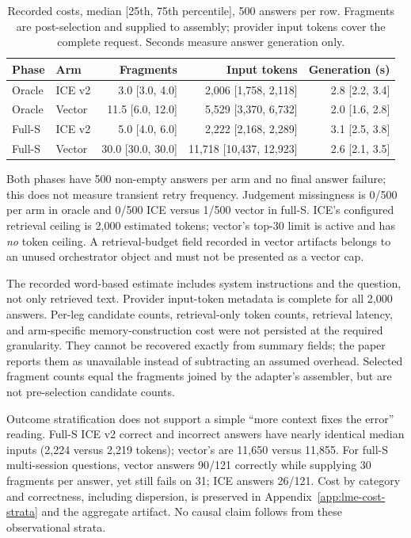 \documentclass[11pt,a4paper]{article}
\begin{document}
\begin{table}[htbp]
\centering\small
\caption{Recorded costs, median [25th, 75th percentile], 500 answers per row. Fragments are post-selection and supplied to assembly; provider input tokens cover the complete request. Seconds measure answer generation only.}
\label{tab:lme-cost}
\begin{tabular}{@{}llrrr@{}}\toprule
Phase & Arm & Fragments & Input tokens & Generation (s)\\\midrule
Oracle & ICE v2 & 3.0 [3.0, 4.0] & 2,006 [1,758, 2,118] & 2.8 [2.2, 3.4]\\
Oracle & Vector & 11.5 [6.0, 12.0] & 5,529 [3,370, 6,732] & 2.0 [1.6, 2.8]\\
Full-S & ICE v2 & 5.0 [4.0, 6.0] & 2,222 [2,168, 2,289] & 3.1 [2.5, 3.8]\\
Full-S & Vector & 30.0 [30.0, 30.0] & 11,718 [10,437, 12,923] & 2.6 [2.1, 3.5]\\
\bottomrule\end{tabular}
\end{table}
Both phases have 500 non-empty answers per arm and no final answer failure; this does not measure transient retry frequency. Judgement missingness is 0/500 per arm in oracle and 0/500 ICE versus 1/500 vector in full-S. ICE's configured retrieval ceiling is 2,000 estimated tokens; vector's top-30 limit is active and has \emph{no} token ceiling. A retrieval-budget field recorded in vector artifacts belongs to an unused orchestrator object and must not be presented as a vector cap.

The recorded word-based estimate includes system instructions and the question, not only retrieved text. Provider input-token metadata is complete for all 2,000 answers. Per-leg candidate counts, retrieval-only token counts, retrieval latency, and arm-specific memory-construction cost were not persisted at the required granularity. They cannot be recovered exactly from summary fields; the paper reports them as unavailable instead of subtracting an assumed overhead. Selected fragment counts equal the fragments joined by the adapter's assembler, but are not pre-selection candidate counts.

Outcome stratification does not support a simple ``more context fixes the error'' reading. Full-S ICE v2 correct and incorrect answers have nearly identical median inputs (2,224 versus 2,219 tokens); vector's are 11,650 versus 11,855. For full-S multi-session questions, vector answers 90/121 correctly while supplying 30 fragments per answer, yet still fails on 31; ICE answers 26/121. Cost by category and correctness, including dispersion, is preserved in Appendix~\ref{app:lme-cost-strata} and the aggregate artifact. No causal claim follows from these observational strata.
\end{document}
